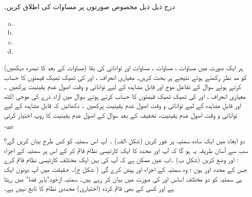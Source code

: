 درج ذیل ذیل مخصوص صورتوں پر مساوات   کی اطلاق کریں۔
\begin{multicols}{4}
\begin{enumerate}[a.]
\item {}
\item {}
\item {}
\item {}
\end{enumerate}
\end{multicols}
 ہر ایک صورت میں مساوات ،  مساوات ، مساوات    اور توانائی کی بقا (مساوات  کے بعد کا تبصرہ دیکھیں) کو مد نظر رکھتے ہوئے نتیجے پر بحث کریں۔
معیاری انحراف ،  اور  کی ٹھیک ٹھیک قیمتوں  کا حساب کرتے ہوئے سوال  کے تفاعل موج اور قابل مشاہدہ  کے لیے توانائی و وقت  اصول  عدم یقینیت    پرکھیں ۔
معیاری انحراف ،  اور  کی ٹھیک ٹھیک قیمتوں  کا حساب کرتے ہوئے سوال   میں آزاد ذرے کی موجی اکٹھ اور قابل مشاہدہ  کے لیے توانائی و وقت اصول  عدم یقینیت   پرکھیں ۔
دکھائیں کہ قابل مشاہدہ   کے لیے توانائی و وقت اصول  عدم یقینیت،  تخفیف کے بعد سوال    کے   اصول عدم یقینیت کا روپ اختیار کرتی ہے۔



دو ابعاد میں ایک سادہ سمتیہ پر غور کریں (شکل  الف) ۔ آپ اس سمتیہ کو کس طرح بیان کریں گے؟  سب سے آسان طریقہ یہ ہو گا کہ آپ  اور  محدد کا ایک کارتیسی نظام قائم کر کے  اس پر سمتیہ  کے اجزاء :   اور  وضع  کریں (شکل  ب) ۔اب عین ممکن ہے کہ آپ کی  بہن  ایک مختلف کارتیسی نظام قائم کرے  جس کے محدد  اور  ہوں ؛  وہ سمتیہ  کے اجزاء   اور   پیش کرے گی  ( شکل ج)۔ حقیقت میں آپ دونوں ایک ہی سمتیہ کو دو مختلف اساس  اور  کی صورت میں بیان کر رہے ہیں۔ سمتیہ ازخود"باہر    فضا"  میں رہتا   ہے اور کسی کے بھی قائم کردہ (اختیاری)  محددی نظام کا تابع نہیں ہے۔

